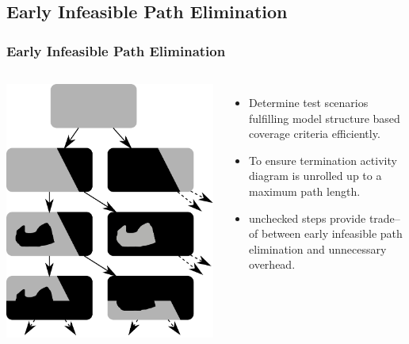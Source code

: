 \documentclass{beamer}
\begin{document}
\subsection{Early Infeasible Path Elimination}
\begin{frame}
\frametitle{Early Infeasible Path Elimination}
	\begin{columns}[c]
			\includegraphics[width=\textwidth]{./pics/VennTree.pdf}
				\begin{itemize}
					\item Determine test scenarios fulfilling model structure based coverage criteria efficiently.
					\item To ensure termination activity diagram is unrolled up to a maximum path length.
					\item unchecked steps provide trade--of between early infeasible path elimination and unnecessary overhead.
				\end{itemize}
	\end{columns}
\end{frame}
\end{document}
